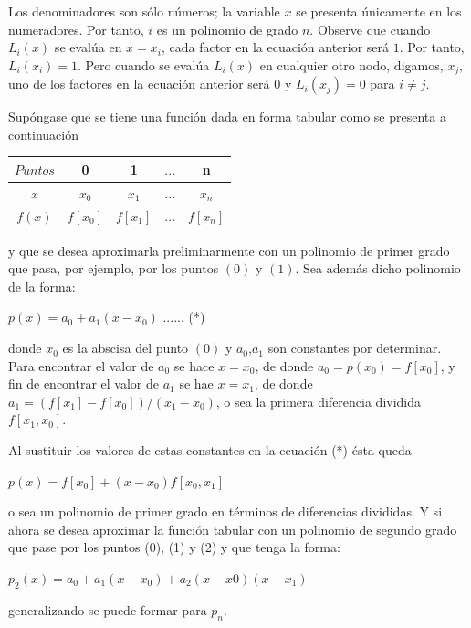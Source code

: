 \documentclass[10pt,a4paper]{article}
\begin{document}
\begin{multicols}{2}
		\vspace*{0.2cm}
		
		\noindent Los denominadores son sólo números; la variable $x$ se presenta únicamente en los numeradores. Por tanto, $i$ es un polinomio de grado $n$. Observe que cuando $L_i(x)$ se evalúa en $x = x_i$, cada factor en la ecuación anterior será $1$. Por tanto, $L_i(x_i) = 1$. Pero cuando se evalúa $L_i(x)$ en cualquier otro nodo, digamos, $x_j$, uno de los factores en la ecuación anterior será $0$ y $L_i(x_j) = 0$ para $i \not= j$.
		\vspace*{0.2cm}
		
		
		\vspace*{0.2cm}
		
		\noindent Supóngase que se tiene una función dada en forma tabular como se presenta a continuación
		
		\begin{center}
			\begin{tabular}{ c|c|c|c|c }
				\hline
				$Puntos$ & 0 & 1 & $...$ & n\\ \hline
				$x$ & $x_0$ & $x_1$ & $...$ & $x_n$  \\
				$f(x)$ & $f[x_0]$ & $f[x_1]$  &$...$ & $f[x_n]$ \\ \hline
				
			\end{tabular}
		\end{center}
		
		y que se desea aproximarla preliminarmente con un polinomio de primer grado que pasa, por ejemplo, por los puntos $(0)$ y $(1)$. Sea además dicho polinomio de la forma:
		\begin{center}
			$p(x) = a_0 + a_1(x-x_0)$ ...... (*)
		\end{center}
		donde $x_0$ es la abscisa del punto $(0)$ y $a_0$,$a_1$ son constantes por determinar. Para encontrar el valor de $a_0$ se hace $x=x_0$, de donde $a_0 = p(x_0) = f[x_0]$, y fin de encontrar el valor de $a_1$ se hae $x = x_1$, de donde $a_1 = (f[x_1]-f[x_0])/(x_1-x_0)$, o sea la primera diferencia dividida $f[x_1,x_0]$.
		
		Al sustituir los valores de estas constantes en la ecuación (*) ésta queda
		\begin{center}
			$p(x) = f[x_0] + (x - x_0)f[x_0,x_1]$
		\end{center}
		o sea un polinomio de primer grado en términos de diferencias divididas.
		Y si ahora se desea aproximar la función tabular con un polinomio de segundo grado que pase por los puntos (0), (1) y (2) y que tenga la forma:
		\begin{center}
			$p_2(x) = a_0 + a_1(x-x_0) + a_2(x-x0)(x-x_1)$
		\end{center}
		generalizando se puede formar para $p_n$.
		

\end{multicols}
\end{document}
